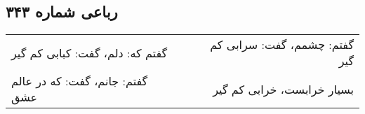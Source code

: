 \begin{center}
\section*{رباعی شماره ۳۴۳}
\label{sec:sh343}
\begin{longtable}{l p{0.5cm} r}
گفتم که: دلم، گفت: کبابی کم گیر
&&
گفتم: چشمم، گفت: سرابی کم گیر
\\
گفتم: جانم، گفت: که در عالم عشق
&&
بسیار خرابست، خرابی کم گیر
\\
\end{longtable}
\end{center}
